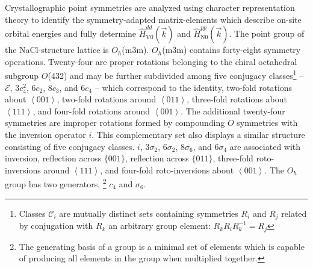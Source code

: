 \documentclass[twocolumn,showpacs,preprintnumbers,superscriptaddress,prb,floatfix,aps,10pt]{revtex4-1}
\newcommand*{\ham}{\hat{H}}
\newcommand*{\class}{\mathcal{C}}
\newcommand*{\id}{\mathcal{E}}
\begin{document}
Crystallographic point symmetries are analyzed using character representation theory to identify the symmetry-adapted matrix-elements which describe on-site orbital energies and fully determine $\ham_{\textrm{V}0}^{dd}(\vec{k}) $ and $\ham_{\textrm{N}0}^{pp}(\vec{k})$. The point group of the NaCl-structure lattice is $O_h$(m$\bar{3}$m). $O_h$(m$\bar{3}$m) contains forty-eight symmetry operations. Twenty-four are proper rotations belonging to the chiral octahedral subgroup $O$(432) and may be further subdivided among five conjugacy classes\footnote{Classes $\class_i$ are mutually distinct sets containing symmetries $R_i$ and $R_j$ related by conjugation with $R_k$ an arbitrary group element: $R_kR_iR_k^{-1}=R_j$} --  $\id$, $3c_4^2$, $6c_2$, $8c_3$, and $6c_4$ -- which correspond to the identity, two-fold rotations about $\left<001\right>$, two-fold rotations around $\left<011\right>$, three-fold rotations about $\left<111\right>$, and four-fold rotations around $\left<001\right>$. The additional twenty-four symmetries are improper rotations formed by compounding $O$ symmetries with the inversion operator $i$. This complementary set also displays a similar structure consisting of five conjugacy classes. $i$, $3\sigma_2$, $6\sigma_2$, $8\sigma_6$, and $6\sigma_4$ are associated with inversion, reflection across $\{001\}$, reflection across $\{011\}$, three-fold roto-inversions around $\left<111\right>$, and four-fold roto-inversions about $\left<001\right>$. The $O_h$ group has two generators, \footnote{The generating basis of a group is a minimal set of elements which is capable of producing all elements in the group when multiplied together.} $c_4$ and $\sigma_6$.
\end{document}
